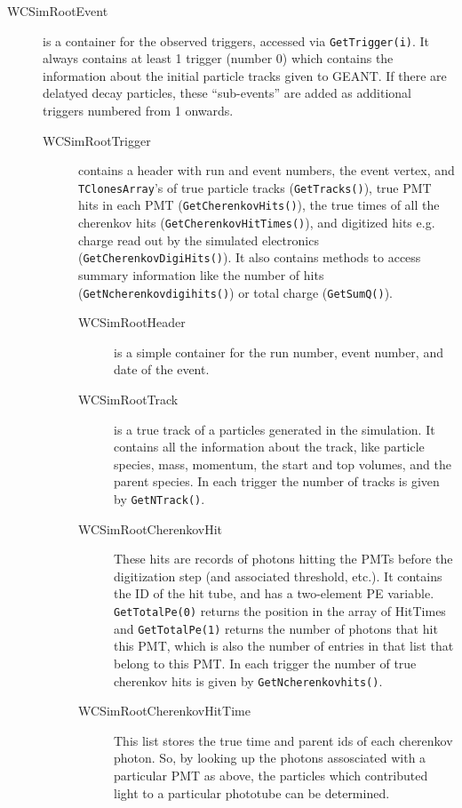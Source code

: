 \begin{description}
  \item[WCSimRootEvent] is a container for the observed triggers, accessed via \texttt{GetTrigger(i)}.  It always contains at least 1 trigger (number 0) which contains the information about the initial particle tracks given to GEANT.  If there are delatyed decay particles, these ``sub-events'' are added as additional triggers numbered from 1 onwards.  
  \begin{description}
    \item[WCSimRootTrigger] contains a header with run and event numbers, the event vertex, and \texttt{TClonesArray}'s of true particle tracks (\texttt{GetTracks()}), true PMT hits in each PMT (\texttt{GetCherenkovHits()}), the true times of all the cherenkov hits (\texttt{GetCherenkovHitTimes()}), and digitized hits e.g. charge read out by the simulated electronics (\texttt{GetCherenkovDigiHits()}).  It also contains methods to access summary information like the number of hits (\texttt{GetNcherenkovdigihits()}) or total charge (\texttt{GetSumQ()}).
    \begin{description}
      \item[WCSimRootHeader] is a simple container for the run number, event number, and date of the event.
      \item[WCSimRootTrack] is a true track of a particles generated in the simulation. It contains all the information about the track, like particle species, mass, momentum, the start and top volumes, and the parent species.  In each trigger the number of tracks is given by \texttt{GetNTrack()}.  %
      \item[WCSimRootCherenkovHit] These hits are records of photons hitting the PMTs before the digitization step (and associated threshold, etc.).  It contains the ID of the hit tube, and has a two-element PE variable.  \texttt{GetTotalPe(0)} returns the position in the array of HitTimes and \texttt{GetTotalPe(1)} returns the number of photons that hit this PMT, which is also the number of entries in that list that belong to this PMT.  In each trigger the number of true cherenkov hits is given by \texttt{GetNcherenkovhits()}.
      \item[WCSimRootCherenkovHitTime] This list stores the true time and parent ids of each cherenkov photon.  So, by looking up the photons assosciated with a particular PMT as above, the particles which contributed light to a particular phototube can be determined.

\end{description}
\end{description}
\end{description}
